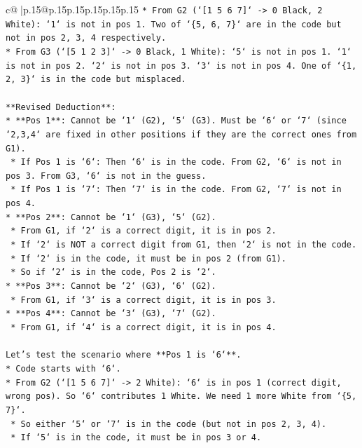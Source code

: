 \documentclass{article}
\begin{document}
{\begin{supertabular}{c@{$\;$}|p{.15\linewidth}@{}p{.15\linewidth}p{.15\linewidth}p{.15\linewidth}p{.15\linewidth}p{.15\linewidth}}
{{{\texttt{*   From G2 (`{[}1 5 6 7{]}` {-}> 0 Black, 2 White): `1` is not in pos 1. Two of `\{5, 6, 7\}` are in the code but not in pos 2, 3, 4 respectively.} \\
\texttt{*   From G3 (`{[}5 1 2 3{]}` {-}> 0 Black, 1 White): `5` is not in pos 1. `1` is not in pos 2. `2` is not in pos 3. `3` is not in pos 4. One of `\{1, 2, 3\}` is in the code but misplaced.} \\
\\ 
\texttt{**Revised Deduction**:} \\
\texttt{*   **Pos 1**: Cannot be `1` (G2), `5` (G3). Must be `6` or `7` (since `2,3,4` are fixed in other positions if they are the correct ones from G1).} \\
\texttt{    *   If Pos 1 is `6`: Then `6` is in the code. From G2, `6` is not in pos 3. From G3, `6` is not in the guess.} \\
\texttt{    *   If Pos 1 is `7`: Then `7` is in the code. From G2, `7` is not in pos 4.} \\
\texttt{*   **Pos 2**: Cannot be `1` (G3), `5` (G2).} \\
\texttt{    *   From G1, if `2` is a correct digit, it is in pos 2.} \\
\texttt{    *   If `2` is NOT a correct digit from G1, then `2` is not in the code.} \\
\texttt{    *   If `2` is in the code, it must be in pos 2 (from G1).} \\
\texttt{    *   So if `2` is in the code, Pos 2 is `2`.} \\
\texttt{*   **Pos 3**: Cannot be `2` (G3), `6` (G2).} \\
\texttt{    *   From G1, if `3` is a correct digit, it is in pos 3.} \\
\texttt{*   **Pos 4**: Cannot be `3` (G3), `7` (G2).} \\
\texttt{    *   From G1, if `4` is a correct digit, it is in pos 4.} \\
\\ 
\texttt{Let's test the scenario where **Pos 1 is `6`**.} \\
\texttt{*   Code starts with `6`.} \\
\texttt{*   From G2 (`{[}1 5 6 7{]}` {-}> 2 White): `6` is in pos 1 (correct digit, wrong pos). So `6` contributes 1 White. We need 1 more White from `\{5, 7\}`.} \\
\texttt{    *   So either `5` or `7` is in the code (but not in pos 2, 3, 4).} \\
\texttt{    *   If `5` is in the code, it must be in pos 3 or 4.} \\
}}}
\end{supertabular}}
\end{document}
